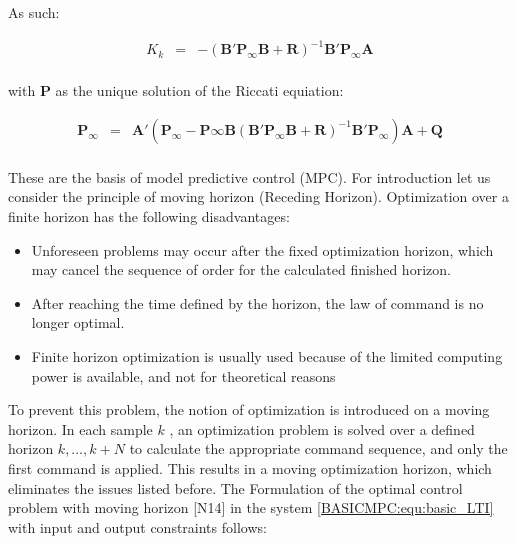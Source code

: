 		As such:
		
		\begin{equation}
        \begin{array}{rcl}
         K_k&=&-(\textbf{B}'\textbf{P}_\infty \textbf{B}+\textbf{R})^{-1}\textbf{B}'\textbf{P}_\infty \textbf{A}\\
        \end{array}
        \label{BASICMPC:equ:control_coefficient_infinite}
    \end{equation}
		
		with $\textbf{P}$ as the unique solution of the Riccati equiation:
		
		\begin{equation}
        \begin{array}{rcl}
				\textbf{P}_\infty&=&\textbf{A}'(\textbf{P}_\infty-\textbf{P}\infty \textbf{B}(\textbf{B}'\textbf{P}_\infty \textbf{B}+\textbf{R})^{-1}\textbf{B}'\textbf{P}_\infty)\textbf{A}+\textbf{Q}\\
        \end{array}
        \label{BASICMPC:equ:Riccati_infinite}
    \end{equation}
		
		These are the basis of model predictive control (MPC). For introduction let us consider the principle of moving horizon (Receding Horizon). Optimization over a finite horizon has the following disadvantages:
		
		\begin{itemize}
			\item Unforeseen problems may occur after the fixed optimization horizon, which may cancel the sequence of order for the 		calculated finished horizon.
		\item After reaching the time defined by the horizon, the law of command is no longer optimal.
		\item Finite horizon optimization is usually used because of the limited computing power is available, and not for theoretical reasons 
		\end{itemize}
		
		To prevent this problem, the notion of optimization is introduced on a moving horizon. In each sample $k$ , an optimization problem is solved over a defined horizon $k,\dots,k+N$ to calculate the appropriate command sequence, and only the first command is applied. This results in a moving optimization horizon, which eliminates the issues listed before. The Formulation of the optimal control problem with moving horizon [N14] in the system \ref{BASICMPC:equ:basic_LTI} with input and output constraints follows:
		

